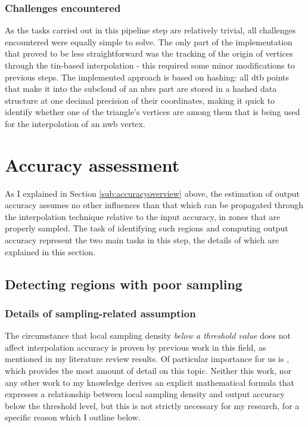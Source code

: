 \subsubsection{Challenges encountered}

As the tasks carried out in this pipeline step are relatively trivial, all challenges encountered were equally simple to solve. The only part of the implementation that proved to be less straightforward was the tracking of the origin of vertices through the \ac{tin}-based interpolation - this required some minor modifications to previous steps. The implemented approach is based on hashing: all \ac{dtb} points that make it into the subcloud of an \ac{nbrs} part are stored in a hashed data structure at one decimal precision of their coordinates, making it quick to identify whether one of the triangle's vertices are among them that is being used for the interpolation of an \ac{nwb} vertex.

\section{Accuracy assessment}
\label{sec:m_accuracyassessment}

As I explained in Section \ref{sub:accuracyoverview} above, the estimation of output accuracy assumes no other influences than that which can be propagated through the interpolation technique relative to the input accuracy, in zones that are properly sampled. The task of identifying such regions and computing output accuracy represent the two main tasks in this step, the details of which are explained in this section.

\subsection{Detecting regions with poor sampling}
\label{sub:m_accuracypoorsampling}

\subsubsection{Details of sampling-related assumption}

The circumstance that local sampling density \textit{below a threshold value} does not affect interpolation accuracy is proven by previous work in this field, as mentioned in my literature review results. Of particular importance for us is \cite{guo_etal_2010}, which provides the most amount of detail on this topic. Neither this work, nor any other work to my knowledge derives an explicit mathematical formula that expresses a relationship between local sampling density and output accuracy below the threshold level, but this is not strictly necessary for my research, for a specific reason which I outline below.


